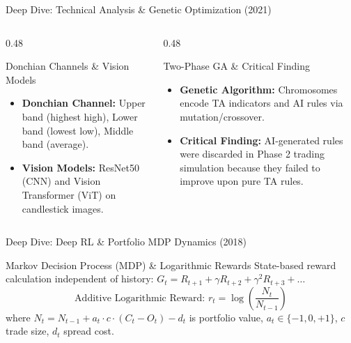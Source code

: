 \documentclass[aspectratio=169]{beamer}
\begin{document}
\begin{frame}{Deep Dive: Technical Analysis \& Genetic Optimization (2021)}

	\begin{columns}[T]
		\begin{column}{0.48\textwidth}
			\begin{block}{Donchian Channels \& Vision Models}
				\begin{itemize}
					\item \textbf{Donchian Channel:} Upper band (highest high), Lower band (lowest low), Middle band (average).
					\item \textbf{Vision Models:} ResNet50 (CNN) and Vision Transformer (ViT) on candlestick images.
				\end{itemize}
			\end{block}
		\end{column}
		\begin{column}{0.48\textwidth}
			\begin{block}{Two-Phase GA \& Critical Finding}
				\begin{itemize}
					\item \textbf{Genetic Algorithm:} Chromosomes encode TA indicators and AI rules via mutation/crossover.
					\item \textbf{Critical Finding:} AI-generated rules were discarded in Phase 2 trading simulation because they failed to improve upon pure TA rules.
				\end{itemize}
			\end{block}
		\end{column}
	\end{columns}
\end{frame}

\begin{frame}{Deep Dive: Deep RL \& Portfolio MDP Dynamics (2018)}
	\begin{block}{Markov Decision Process (MDP) \& Logarithmic Rewards}
		State-based reward calculation independent of history: $G_t = R_{t+1} + \gamma R_{t+2} + \gamma^2 R_{t+3} + \dots$
		$$\text{Additive Logarithmic Reward: } r_t = \log \left(\frac{N_t}{N_{t-1}}\right)$$
		where $N_t = N_{t-1} + a_t \cdot c \cdot (C_t - O_t) - d_t$ is portfolio value, $a_t \in \{-1,0,+1\}$, $c$ trade size, $d_t$ spread cost.
	\end{block}

\end{frame}
\end{document}
